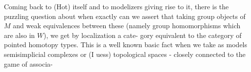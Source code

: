 Coming back to (Hot) itself and to modelizers  giving rise to it,
there is the puzzling question about when exactly can we assert that
taking group objects of $M$ and weak equivalences between these (namely
group homomorphisms which are also in $W$),  we get by localization a cate-%
gory equivalent to the category  of pointed  homotopy types.  This is
a well known basic fact when we take as models semisimplicial complexes or
(I uess) topological spaces -  closely connected to the game of associa-%

